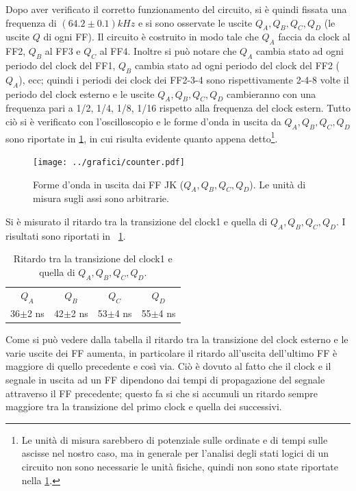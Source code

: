\documentclass[a4paper,10pt]{article}
\begin{document}
Dopo aver verificato il corretto funzionamento del circuito, si è quindi fissata una frequenza di $(64.2 \pm 0.1)kHz$ e si sono osservate le uscite $Q_A,Q_B,Q_C,Q_D$ (le uscite $Q$ di ogni FF). Il circuito è costruito in modo tale che $Q_A$ faccia da clock al FF2, $Q_B$ al FF3 e $Q_C$ al FF4. Inoltre si può notare che $Q_A$ cambia stato ad ogni periodo del clock del FF1, $Q_B$ cambia stato ad ogni periodo del clock del FF2 ($Q_A$), ecc; quindi i periodi dei clock dei FF2-3-4 sono rispettivamente 2-4-8 volte il periodo del clock esterno e le uscite $Q_A,Q_B,Q_C,Q_D$ cambieranno con una frequenza pari a 1/2, 1/4, 1/8, 1/16 rispetto alla frequenza del clock estern. Tutto ciò si è verificato con l'oscilloscopio e le forme d'onda in uscita da $Q_A,Q_B,Q_C,Q_D$ sono riportate in \cref{fig:divisor}, in cui risulta evidente quanto appena detto\footnote{Le unità di misura sarebbero di potenziale sulle ordinate e di tempi sulle ascisse nel nostro caso, ma in generale per l'analisi degli stati logici di un circuito non sono necessarie le unità fisiche, quindi non sono state riportate nella \cref{fig:divisor}.}.


\begin{figure}[H]
	\centering
	\texttt{[image: ../grafici/counter.pdf]}
	\caption{Forme d'onda in uscita dai FF JK ($Q_A,Q_B,Q_C,Q_D$). Le unità di misura sugli assi sono arbitrarie.}
	\label{fig:divisor}
\end{figure}



Si è misurato il ritardo tra la transizione del clock1 e quella di $Q_A,Q_B,Q_C,Q_D$. I risultati sono riportati in \tablename{~\ref{tab:time}}.

\begin{table}[H]
	\centering
	\begin{tabular}{cccc}
\hline
$Q_A$ & $Q_B$ & $Q_C$ & $Q_D$ \\
36$\pm$2 ns & 42$\pm$2 ns & 53$\pm$4 ns & 55$\pm$4 ns \\
\hline
	\end{tabular}
	\caption{Ritardo tra la transizione del clock1 e quella di $Q_A,Q_B,Q_C,Q_D$.}
	\label{tab:time}
\end{table}

Come si può vedere dalla tabella il ritardo tra la transizione del clock esterno e le varie uscite dei FF aumenta, in particolare il ritardo all'uscita dell'ultimo FF è maggiore di quello precedente e così via. Ciò è dovuto al fatto che il clock e il segnale in uscita ad un FF dipendono dai tempi di propagazione del segnale attraverso il FF precedente; questo fa si che si accumuli un ritardo sempre maggiore tra la transizione del primo clock e quella dei successivi.
\end{document}
